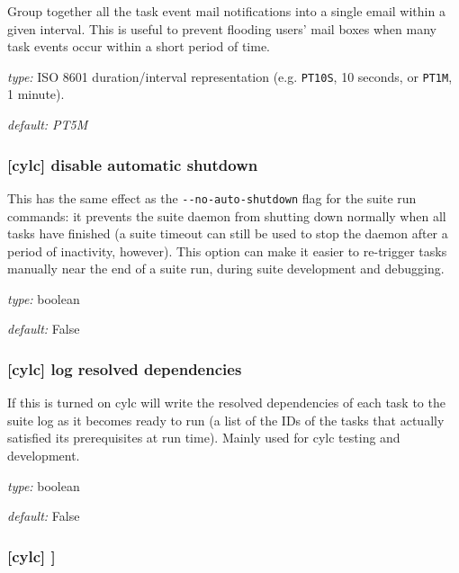 Group together all the task event mail notifications into a single email within
a given interval. This is useful to prevent flooding users' mail boxes when
many task events occur within a short period of time.

\begin{myitemize}
  \item {\em type:} ISO 8601 duration/interval representation (e.g. \lstinline=PT10S=, 10 seconds, or \lstinline=PT1M=, 1 minute).
  \item {\em default: PT5M}
\end{myitemize}

\subsubsection[disable automatic shutdown]{[cylc] \textrightarrow disable automatic shutdown}

This has the same effect as the \lstinline{--no-auto-shutdown} flag for
the suite run commands: it prevents the suite daemon from shutting down
normally when all tasks have finished (a suite timeout can still be used to
stop the daemon after a period of inactivity, however).  This option can
make it easier to re-trigger tasks manually near the end of a suite run,
during suite development and debugging.

\begin{myitemize}
    \item {\em type:} boolean
    \item {\em default:} False
\end{myitemize}

\subsubsection[log resolved dependencies]{[cylc] \textrightarrow log resolved dependencies}

If this is turned on cylc will write the resolved dependencies of each
task to the suite log as it becomes ready to run (a list of the IDs of
the tasks that actually satisfied its prerequisites at run time). Mainly
used for cylc testing and development.

\begin{myitemize}
    \item {\em type:} boolean
    \item {\em default:} False
\end{myitemize}

\subsubsection[{[[}parameters{]]}]{[cylc] \textrightarrow [[parameters]]}

